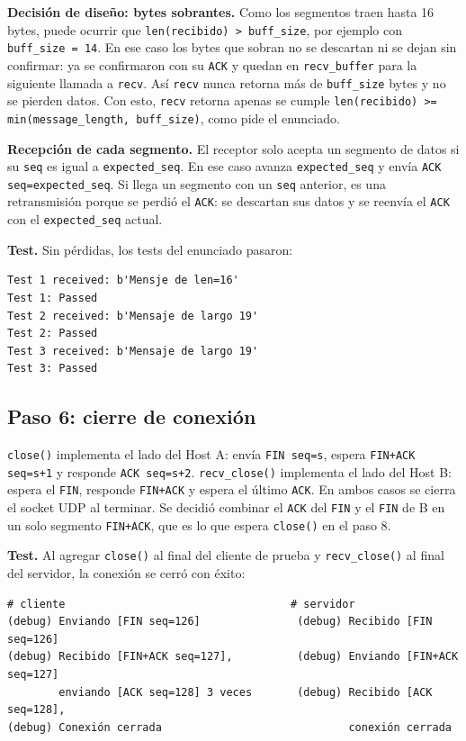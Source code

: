 \documentclass[11pt,letterpaper]{article}
\begin{document}
\textbf{Decisión de diseño: bytes sobrantes.} Como los segmentos traen hasta 16 bytes,
puede ocurrir que \texttt{len(recibido) > buff\_size}, por ejemplo con
\texttt{buff\_size = 14}. En ese caso los bytes que sobran no se descartan ni se dejan
sin confirmar: ya se confirmaron con su \texttt{ACK} y quedan en \texttt{recv\_buffer}
para la siguiente llamada a \texttt{recv}. Así \texttt{recv} nunca retorna más de
\texttt{buff\_size} bytes y no se pierden datos. Con esto, \texttt{recv} retorna apenas se
cumple \texttt{len(recibido) >= min(message\_length, buff\_size)}, como pide el enunciado.

\textbf{Recepción de cada segmento.} El receptor solo acepta un segmento de datos si su
\texttt{seq} es igual a \texttt{expected\_seq}. En ese caso avanza
\texttt{expected\_seq} y envía \texttt{ACK seq=expected\_seq}. Si llega un segmento con un
\texttt{seq} anterior, es una retransmisión porque se perdió el \texttt{ACK}: se descartan
sus datos y se reenvía el \texttt{ACK} con el \texttt{expected\_seq} actual.

\textbf{Test.} Sin pérdidas, los tests del enunciado pasaron:

\begin{lstlisting}
Test 1 received: b'Mensje de len=16'
Test 1: Passed
Test 2 received: b'Mensaje de largo 19'
Test 2: Passed
Test 3 received: b'Mensaje de largo 19'
Test 3: Passed
\end{lstlisting}

\subsection{Paso 6: cierre de conexión}

\texttt{close()} implementa el lado del Host A: envía \texttt{FIN seq=s}, espera
\texttt{FIN+ACK seq=s+1} y responde \texttt{ACK seq=s+2}. \texttt{recv\_close()}
implementa el lado del Host B: espera el \texttt{FIN}, responde \texttt{FIN+ACK} y espera
el último \texttt{ACK}. En ambos casos se cierra el socket UDP al terminar. Se decidió
combinar el \texttt{ACK} del \texttt{FIN} y el \texttt{FIN} de B en un solo segmento
\texttt{FIN+ACK}, que es lo que espera \texttt{close()} en el paso 8.

\textbf{Test.} Al agregar \texttt{close()} al final del cliente de prueba y
\texttt{recv\_close()} al final del servidor, la conexión se cerró con éxito:

\begin{lstlisting}
# cliente                                   # servidor
(debug) Enviando [FIN seq=126]               (debug) Recibido [FIN seq=126]
(debug) Recibido [FIN+ACK seq=127],          (debug) Enviando [FIN+ACK seq=127]
        enviando [ACK seq=128] 3 veces       (debug) Recibido [ACK seq=128],
(debug) Conexión cerrada                             conexión cerrada
\end{lstlisting}
\end{document}
